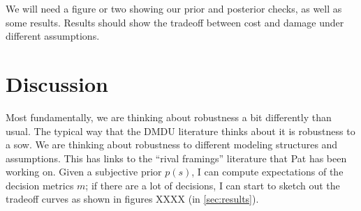 \documentclass[12pt]{article}
\begin{document}
We will need a figure or two showing our prior and posterior checks, as well as some results.
Results should show the tradeoff between cost and damage under different assumptions.

\section{Discussion}

Most fundamentally, we are thinking about robustness a bit differently than usual.
The typical way that the DMDU literature thinks about it is robustness to a \gls{sow}.
We are thinking about robustness to different modeling structures and assumptions.
This has links to the ``rival framings'' literature that Pat has been working on.
Given a subjective prior $p(s)$, I can compute expectations of the decision metrics $m$; if there are a lot of decisions, I can start to sketch out the tradeoff curves as shown in figures XXXX (in \cref{sec:results}).
\end{document}
